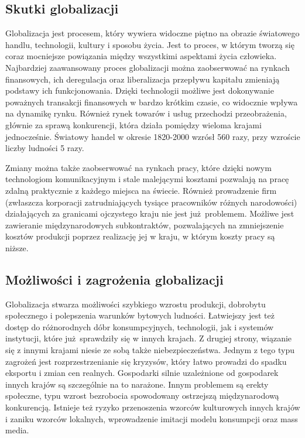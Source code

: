 \documentclass[12pt]{extarticle}
\begin{document}
\subsection{Skutki globalizacji}

Globalizacja jest procesem, który wywiera widoczne piętno na obrazie światowego handlu, technologii, kultury i sposobu życia. Jest to proces, w którym tworzą się coraz mocniejsze powiązania między wszystkimi aspektami życia człowieka. Najbardziej zaawansowany proces globalizacji można zaobserwować na rynkach finansowych, ich deregulacja oraz liberalizacja przepływu kapitału zmieniają podstawy ich funkcjonowania. Dzięki technologii możliwe jest dokonywanie poważnych transakcji finansowych w bardzo krótkim czasie, co widocznie wpływa na dynamikę rynku. Również rynek towarów i usług przechodzi przeobrażenia, głównie za sprawą konkurencji, która działa pomiędzy wieloma krajami jednocześnie. Światowy handel w okresie 1820-2000 wzrósł 560 razy, przy wzroście liczby ludności 5 razy.

Zmiany można także zaobserwować na rynkach pracy, które dzięki nowym technologiom komunikacyjnym i stale malejącymi kosztami pozwalają na pracę zdalną praktycznie z każdego miejsca na świecie. Również prowadzenie firm (zwłaszcza korporacji zatrudniających tysiące pracowników różnych narodowości) działających za granicami ojczystego kraju nie jest już problemem. Możliwe jest zawieranie międzynarodowych subkontraktów, pozwalających na zmniejszenie kosztów produkcji poprzez realizację jej w kraju, w którym koszty pracy są niższe.

\subsection{Możliwości i zagrożenia globalizacji}

Globalizacja stwarza możliwości szybkiego wzrostu produkcji, dobrobytu społecznego i polepszenia warunków bytowych ludności. Łatwiejszy jest też dostęp do różnorodnych dóbr konsumpcyjnych, technologii, jak i systemów instytucji, które już sprawdziły się w innych krajach. Z drugiej strony, wiązanie się z innymi krajami niesie ze sobą także niebezpieczeństwa. Jednym z tego typu zagrożeń jest rozprzestrzenianie się kryzysów, który łatwo prowadzi do spadku eksportu i zmian cen realnych. Gospodarki silnie uzależnione od gospodarek innych krajów są szczególnie na to narażone. Innym problemem są erekty społeczne, typu wzrost bezrobocia spowodowany ostrzejszą międzynarodową konkurencją. Istnieje też ryzyko przenoszenia wzorców kulturowych innych krajów i zaniku wzorców lokalnych, wprowadzenie imitacji modelu konsumpcji oraz mass media.
\end{document}
